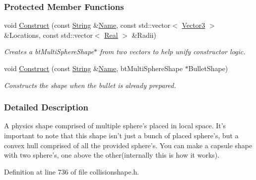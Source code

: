 \subsubsection*{Protected Member Functions}
\begin{DoxyCompactItemize}
\item 
void \hyperlink{classMezzanine_1_1MultiSphereCollisionShape_ad957ea7329c1516d64eedbb867d14d6e}{Construct} (const \hyperlink{namespaceMezzanine_acf9fcc130e6ebf08e3d8491aebcf1c86}{String} \&\hyperlink{classMezzanine_1_1CollisionShape_aac524c5c56fa4d158bc071f8aecfbe79}{Name}, const std::vector$<$ \hyperlink{classMezzanine_1_1Vector3}{Vector3} $>$ \&Locations, const std::vector$<$ \hyperlink{namespaceMezzanine_a726731b1a7df72bf3583e4a97282c6f6}{Real} $>$ \&Radii)
\begin{DoxyCompactList}\small\item\em Creates a btMultiSphereShape$\ast$ from two vectors to help unify constructor logic. \item\end{DoxyCompactList}\item 
void \hyperlink{classMezzanine_1_1MultiSphereCollisionShape_ab8d05e13b83063e0fac129b1c7dfea73}{Construct} (const \hyperlink{namespaceMezzanine_acf9fcc130e6ebf08e3d8491aebcf1c86}{String} \&\hyperlink{classMezzanine_1_1CollisionShape_aac524c5c56fa4d158bc071f8aecfbe79}{Name}, btMultiSphereShape $\ast$BulletShape)
\begin{DoxyCompactList}\small\item\em Constructs the shape when the bullet is already prepared. \item\end{DoxyCompactList}\end{DoxyCompactItemize}


\subsubsection{Detailed Description}
A physics shape comprised of multiple sphere's placed in local space. It's important to note that this shape isn't just a bunch of placed sphere's, but a convex hull comprised of all the provided sphere's. You can make a capsule shape with two sphere's, one above the other(internally this is how it works). 

Definition at line 736 of file collisionshape.h.



